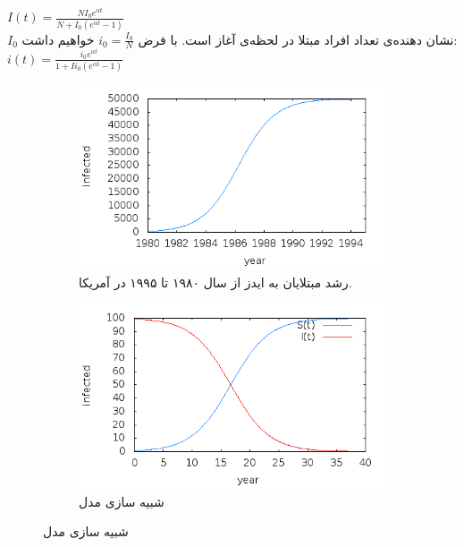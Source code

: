 \begin{persian}
{%

\begin{center}
 {
$I(t) = \frac{N I_{0}e^{\alpha t}}{N + I_{0}(e^{\alpha t} - 1)}$
\\
$I_{0}$ نشان دهنده‌ی تعداد افراد مبتلا در لحظه‌ی آغاز است. 
با فرض 
$i_{0}=\frac{I_{0}}{N}$ خواهیم داشت: \\
$i(t) = \frac{i_{0}e^{\alpha t}}{1 + Ii_{0}(e^{\alpha t} - 1)}$}
\\
\end{center}

\begin{figure}[h]
 \centering
 \begin{subfigure}[b]{0.6\textwidth}
 \includegraphics[width=\textwidth]{figures/SI/aids1980-95}
 \caption{رشد مبتلایان به ایدز از سال ۱۹۸۰ تا ۱۹۹۵ در آمریکا.}
 \end{subfigure}%
 
 \begin{subfigure}[b]{0.6\textwidth}
 \includegraphics[width=\textwidth]{figures/SI/aidsSt-It}
 \caption{شبیه سازی مدل }
 \end{subfigure}
 

\end{figure}}
\end{persian}

